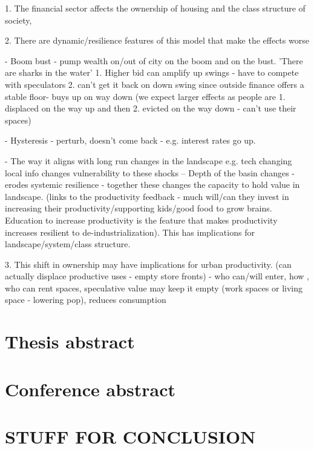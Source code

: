 
1. The financial sector affects the ownership of housing and the class structure of society, 

2. There are dynamic/resilience features of this model that make the effects worse

- Boom bust - pump wealth on/out of city on the boom and on the bust. 'There are sharks in the water' 1. Higher bid can amplify up swings - have to compete with speculators 2. can't get it back on down swing since outside finance offers a stable floor- buys up on way down (we expect larger effects as people are 1. displaced on the way up and then 2. evicted on the way down - can't use their spaces)

- Hysteresis - perturb, doesn't come back - e.g. interest rates go up.

- The way it aligns with long run changes in the landscape e.g. tech changing local info changes vulnerability to these shocks -- Depth of the basin changes - erodes systemic resilience - together these changes the capacity to hold value in landscape. (links to the productivity feedback - much will/can they invest in increasing their productivity/supporting kids/good food to grow brains. Education to increase productivity is the feature that makes productivity increases resilient to de-industrialization). This has implications for landscape/system/class structure.

3. This shift in ownership may have implications for urban productivity. (can actually displace productive uses - empty store fronts) - who can/will enter, how , who can rent spaces, speculative value may keep it empty (work spaces or living space - lowering pop), reduces consumption

\section{Thesis abstract}

\section{Conference abstract}


\section{STUFF FOR CONCLUSION}




